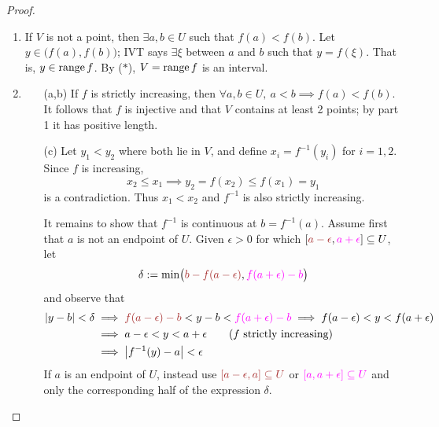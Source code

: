 \begin{proof}
\begin{enumerate}
  \item If $V$ is not a point, then $\exists a,b\in U$ such that $f(a)<f(b)$. Let $y\in\bigl(f(a),f(b)\bigr)$; IVT says $\exists\xi$ between $a$ and $b$ such that $y=f(\xi)$. That is, $y\in \operatorname{range} f$. By ($\ast$), $V=\operatorname{range} f$ is an interval.
  \item\begin{enumerate}
    \item[(a,b)] If $f$ is strictly increasing, then $\forall a,b\in U,\ a<b\implies f(a)<f(b)$. It follows that $f$ is injective and that $V$ contains at least 2 points; by part 1 it has positive length.
    \item[(c)] Let $y_1<y_2$ where both lie in $V$, and define $x_i=f^{-1}(y_i)$ for $i=1,2$. Since $f$ is increasing,
		\[
			x_2\le x_1\implies y_2=f(x_2)\le f(x_1)=y_1
		\]
		is a contradiction. Thus $x_1<x_2$ and $f^{-1}$ is also strictly increasing.\par
		It remains to show that $f^{-1}$ is continuous at $b=f^{-1}(a)$. Assume first that $a$ is not an endpoint of $U$. Given $\epsilon>0$ for which $[\textcolor{Brown}{a-\epsilon},\textcolor{Magenta}{a+\epsilon}]\subseteq U$, let
		\[\delta:=\min\bigl(\textcolor{Brown}{b-f(a-\epsilon)},\textcolor{Magenta}{f(a+\epsilon)-b}\bigr)\]
		and observe that
		\begin{align*}
			\nm{y-b}<\delta&\implies \textcolor{Brown}{f(a-\epsilon)-b}<y-b<\textcolor{Magenta}{f(a+\epsilon)-b}%
			\implies f(a-\epsilon)<y<f(a+\epsilon)\\
			&\implies a-\epsilon<y<a+\epsilon \tag{$f$ strictly increasing}\\
			&\implies \nm{f^{-1}(y)-a}<\epsilon
		\end{align*}
		If $a$ is an endpoint of $U$, instead use $\textcolor{Brown}{[a-\epsilon,a]\subseteq U}$ or $\textcolor{Magenta}{[a,a+\epsilon]\subseteq U}$ and only the corresponding half of the expression $\delta$.\qedhere
  \end{enumerate}
\end{enumerate}
\end{proof}


\goodbreak

